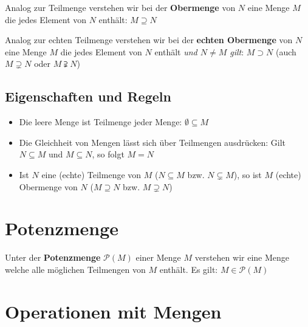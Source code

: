\documentclass[../../main.tex]{subfiles}
\begin{document}
	\begin{definition}[Obermenge]
		Analog zur Teilmenge verstehen wir bei der \textbf{Obermenge} von $N$ eine Menge $M$ die jedes Element von $N$ enthält: $M \supseteq N$
	\end{definition}

	\begin{definition}
		Analog zur echten Teilmenge verstehen wir bei der \textbf{echten Obermenge} von $N$ eine Menge $M$ die jedes Element von $N$ enthält \textit{und $N \not= M$ gilt}: $M \supset N$ (auch $M \supsetneq N$ oder $M \supsetneqq N$)
	\end{definition}

	\subsection*{Eigenschaften und Regeln}
	\begin{itemize}
		\item Die leere Menge ist Teilmenge jeder Menge: $\emptyset \subseteq M$
		\item Die Gleichheit von Mengen lässt sich über Teilmengen ausdrücken: Gilt $N \subseteq M$ und $M \subseteq N$, so folgt $M = N$
		\item Ist $N$ eine (echte) Teilmenge von $M$ ($N \subseteq M$ bzw. $N \subsetneq M$), so ist $M$ (echte) Obermenge von $N$ ($M \supseteq N$ bzw. $M \supsetneq N$)
	\end{itemize}



	\section{Potenzmenge}
	
	\begin{definition}[Potenzmenge]
		Unter der \textbf{Potenzmenge} $\mathcal{P}(M)$ einer Menge $M$ verstehen wir eine Menge welche alle möglichen Teilmengen von $M$ enthält.  Es gilt: $M \in \mathcal{P}(M)$
	\end{definition}
	
	
	
	\section{Operationen mit Mengen}
\end{document}

